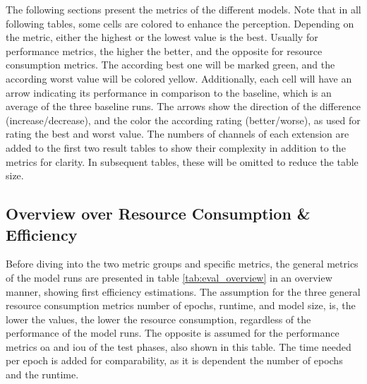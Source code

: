 The following sections present the metrics of the different models. Note that in all following tables, some cells are colored to enhance the perception. Depending on the metric, either the highest or the lowest value is the best. Usually for performance metrics, the higher the better, and the opposite for resource consumption metrics. The according best one will be marked green, and the according worst value will be colored yellow. Additionally, each cell will have an arrow indicating its performance in comparison to the baseline, which is an average of the three baseline runs. The arrows show the direction of the difference (increase/decrease), and the color the according rating (better/worse), as used for rating the best and worst value. The numbers of channels of each extension are added to the first two result tables to show their complexity in addition to the metrics for clarity. In subsequent tables, these will be omitted to reduce the table size.

\subsection{Overview over Resource Consumption \& Efficiency}

Before diving into the two metric groups and specific metrics, the general metrics of the model runs are presented in table \ref{tab:eval_overview} in an overview manner, showing first efficiency estimations. The assumption for the three general resource consumption metrics number of epochs, runtime, and model size, is, the lower the values, the lower the resource consumption, regardless of the performance of the model runs. The opposite is assumed for the performance metrics \gls{oa} and \gls{iou} of the test phases, also shown in this table. The time needed per epoch is added for comparability, as it is dependent the number of epochs and the runtime. 

